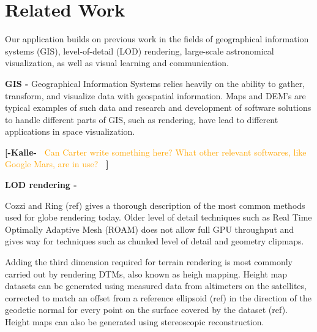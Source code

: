 \documentclass[journal]{vgtc}                %
\newcommand{\kallecomment}[1]{\textbf{[-Kalle-~}
    \textcolor{orange}{#1}
    \textbf{~]}}
\begin{document}
\section{Related Work} \label{sec:relatedwork}
Our application builds on previous work in the fields of geographical information systems (GIS), level-of-detail (LOD) rendering, large-scale astronomical visualization, as well as visual learning and communication.

\textbf{GIS - }Geographical Information Systems relies heavily on the ability to gather, transform, and visualize data with geospatial information.
Maps and DEM's are typical examples of such data and research and development of software solutions to handle different parts of GIS, such as rendering, have lead to different applications in space visualization.

\kallecomment{Can Carter write something here? What other relevant softwares, like Google Mars, are in use?}

\textbf{LOD rendering - } 

Cozzi and Ring (ref) gives a thorough description of the most common methods used for globe rendering today.
Older level of detail techniques such as Real Time Optimally Adaptive Mesh (ROAM) does not allow full GPU throughput and gives way for techniques such as chunked level of detail and geometry clipmaps.








Adding the third dimension required for terrain rendering is most commonly carried out by rendering DTMs, also known as heigh mapping.
Height map datasets can be generated using measured data from altimeters on the satellites, corrected to match an offset from a reference ellipsoid (ref) in the direction of the geodetic normal for every point on the surface covered by the dataset (ref).
Height maps can also be generated using stereoscopic reconstruction.
\end{document}
